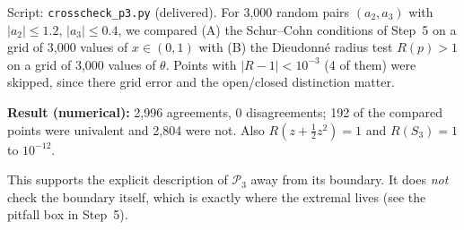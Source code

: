 Script: \texttt{crosscheck\_p3.py} (delivered). For 3{,}000 random pairs $(a_2,a_3)$ with $|a_2|\le1.2$, $|a_3|\le0.4$, we compared
(A) the Schur--Cohn conditions of Step~5 on a grid of 3{,}000 values of $x\in(0,1)$ with
(B) the Dieudonné radius test $R(p)>1$ on a grid of 3{,}000 values of $\theta$.
Points with $|R-1|<10^{-3}$ (4 of them) were skipped, since there grid error and the open/closed distinction matter.

\textbf{Result (numerical):} 2{,}996 agreements, 0 disagreements; 192 of the compared points were univalent and 2{,}804 were not. Also $R(z+\tfrac12z^2)=1$ and $R(S_3)=1$ to $10^{-12}$.

This supports the explicit description of $\mathcal P_3$ away from its boundary. It does \emph{not} check the boundary itself, which is exactly where the extremal lives (see the pitfall box in Step~5).
